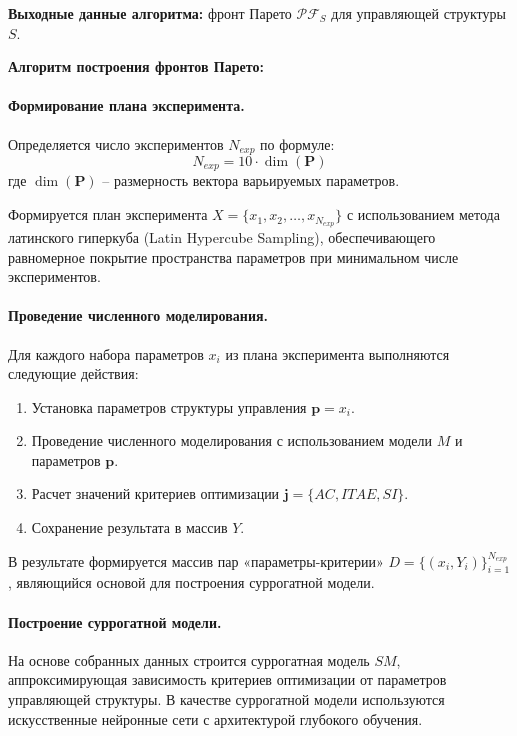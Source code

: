 \textbf{Выходные данные алгоритма:} фронт Парето $\mathcal{PF}_{S}$ для управляющей структуры $S$.

\textbf{Алгоритм построения фронтов Парето:}

\paragraph*{Формирование плана эксперимента.}

Определяется число экспериментов $N_{exp}$ по формуле:
\begin{equation}
    N_{exp} = 10 \cdot \dim(\mathbf{P})
\end{equation}
где $\dim(\mathbf{P})$ -- размерность вектора варьируемых параметров.

Формируется план эксперимента $X = \{x_1, x_2, \ldots, x_{N_{exp}}\}$ с использованием метода латинского
гиперкуба (Latin Hypercube Sampling), обеспечивающего равномерное покрытие пространства параметров при минимальном числе экспериментов.

\paragraph*{Проведение численного моделирования.}

Для каждого набора параметров $x_i$ из плана эксперимента выполняются следующие действия:
\begin{enumerate}
    \item Установка параметров структуры управления $\mathbf{p} = x_i$.
    \item Проведение численного моделирования с использованием модели $M$ и параметров $\mathbf{p}$.
    \item Расчет значений критериев оптимизации $\mathbf{j} = \{AC, ITAE, SI\}$.
    \item Сохранение результата в массив $Y$.
\end{enumerate}

В результате формируется массив пар «параметры-критерии» $D = \{(x_i, Y_i)\}_{i=1}^{N_{exp}}$,
являющийся основой для построения суррогатной модели.

\paragraph*{Построение суррогатной модели.}

На основе собранных данных строится суррогатная модель $SM$, аппроксимирующая зависимость критериев
оптимизации от параметров управляющей структуры. В качестве суррогатной модели
используются искусственные нейронные сети с архитектурой глубокого обучения.

